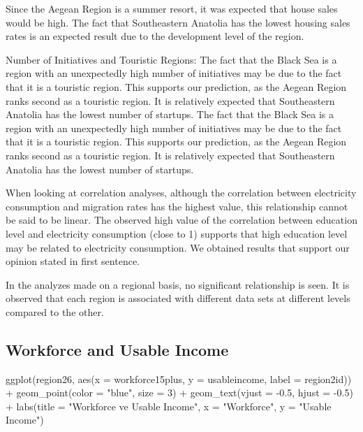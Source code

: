 \documentclass[
  11pt,
  a4paper,
  DIV=11,
  numbers=noendperiod]{scrartcl}
\newenvironment{Shaded}{\begin{snugshade}}{\end{snugshade}}
\newcommand{\AttributeTok}[1]{\textcolor[rgb]{0.40,0.45,0.13}{#1}}
\newcommand{\DecValTok}[1]{\textcolor[rgb]{0.68,0.00,0.00}{#1}}
\newcommand{\FloatTok}[1]{\textcolor[rgb]{0.68,0.00,0.00}{#1}}
\newcommand{\FunctionTok}[1]{\textcolor[rgb]{0.28,0.35,0.67}{#1}}
\newcommand{\NormalTok}[1]{\textcolor[rgb]{0.00,0.23,0.31}{#1}}
\newcommand{\SpecialCharTok}[1]{\textcolor[rgb]{0.37,0.37,0.37}{#1}}
\newcommand{\StringTok}[1]{\textcolor[rgb]{0.13,0.47,0.30}{#1}}
\begin{document}
Since the Aegean Region is a summer resort, it was expected that house
sales would be high. The fact that Southeastern Anatolia has the lowest
housing sales rates is an expected result due to the development level
of the region.

Number of Initiatives and Touristic Regions: The fact that the Black Sea
is a region with an unexpectedly high number of initiatives may be due
to the fact that it is a touristic region. This supports our prediction,
as the Aegean Region ranks second as a touristic region. It is
relatively expected that Southeastern Anatolia has the lowest number of
startups. The fact that the Black Sea is a region with an unexpectedly
high number of initiatives may be due to the fact that it is a touristic
region. This supports our prediction, as the Aegean Region ranks second
as a touristic region. It is relatively expected that Southeastern
Anatolia has the lowest number of startups.

When looking at correlation analyses, although the correlation between
electricity consumption and migration rates has the highest value, this
relationship cannot be said to be linear. The observed high value of the
correlation between education level and electricity consumption (close
to 1) supports that high education level may be related to electricity
consumption. We obtained results that support our opinion stated in
first sentence.

In the analyzes made on a regional basis, no significant relationship is
seen. It is observed that each region is associated with different data
sets at different levels compared to the other.

\hypertarget{workforce-and-usable-income}{%
\subsection{Workforce and Usable
Income}\label{workforce-and-usable-income}}

\begin{Shaded}
\begin{Highlighting}[]
\FunctionTok{ggplot}\NormalTok{(region26, }\FunctionTok{aes}\NormalTok{(}\AttributeTok{x =}\NormalTok{ workforce15plus, }\AttributeTok{y =}\NormalTok{ usableincome, }\AttributeTok{label =}\NormalTok{ region2id)) }\SpecialCharTok{+}
\FunctionTok{geom\_point}\NormalTok{(}\AttributeTok{color =} \StringTok{"blue"}\NormalTok{, }\AttributeTok{size =} \DecValTok{3}\NormalTok{) }\SpecialCharTok{+} 
\FunctionTok{geom\_text}\NormalTok{(}\AttributeTok{vjust =} \SpecialCharTok{{-}}\FloatTok{0.5}\NormalTok{, }\AttributeTok{hjust =} \SpecialCharTok{{-}}\FloatTok{0.5}\NormalTok{) }\SpecialCharTok{+}
\FunctionTok{labs}\NormalTok{(}\AttributeTok{title =} \StringTok{"Workforce ve Usable Income"}\NormalTok{, }\AttributeTok{x =} \StringTok{"Workforce"}\NormalTok{, }\AttributeTok{y =} \StringTok{"Usable Income"}\NormalTok{)}
\end{Highlighting}
\end{Shaded}
\end{document}
